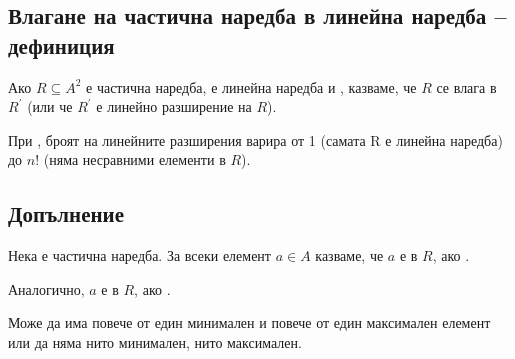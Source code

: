 \subsection*{Влагане на частична наредба в линейна наредба – дефиниция}
Ако \(R \subseteq A^2\) е частична наредба,  е линейна наредба и 
, казваме, че \(R\) се влага в \(R^{'}\) (или че \(R^{'}\) е линейно 
разширение на \(R\)).

При , броят на линейните разширения варира от 1 (самата R е линейна наредба) 
до \(n!\) (няма несравними елементи в \(R\)).

\subsection*{Допълнение}
Нека  е частична наредба. За всеки елемент \(a \in A\) казваме, че \(a\) е 
 в \(R\), ако .

Аналогично, \(a\) е  в \(R\), ако .

Може да има повече от един минимален и повече от един максимален елемент или да няма нито минимален, нито 
максимален.